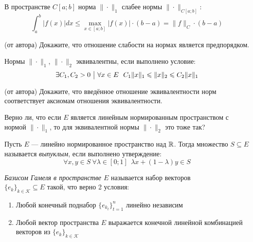 \begin{example}
	В пространстве $C[a; b]$ норма $\|\cdot\|_1$ слабее нормы $\|\cdot\|_{C[a; b]}$:
	\[
		\int_a^b |f(x)|dx \le \max_{x \in [a; b]} |f(x)| \cdot (b - a) = \|f\|_C \cdot (b - a)
	\]
\end{example}

\begin{exercise} (от автора)
	Докажите, что отношение слабости на нормах является предпорядком.
\end{exercise}

\begin{definition}
	Нормы $\|\cdot\|_1$, $\|\cdot\|_2$ эквивалентны, если выполнено условие:
	\[
		\exists C_1, C_2 > 0 \such \forall x \in E\ \ C_1\|x\|_1 \le \|x\|_2 \le C_2\|x\|_1
	\]
\end{definition}

\begin{exercise} (от автора)
	Докажите, что введённое отношение эквивалентности норм соответствует аксиомам отношения эквивалентности.
\end{exercise}

\begin{exercise}
	Верно ли, что если $E$ является линейным нормированным пространством с нормой $\|\cdot\|_1$, то для эквивалентной нормы $\|\cdot\|_2$ это тоже так?
\end{exercise}

\begin{definition}
	Пусть $E$ --- линейно нормированное пространство над $\mathbb{R}$. Тогда множество $S \subseteq E$ называется \textit{выпуклым}, если выполнено утверждение:
	\[
		\forall x, y \in S\ \forall \lambda \in [0; 1]\ \ \lambda x + (1 - \lambda)y \in S
	\]
\end{definition}

\begin{definition}
	\textit{Базисом Гамеля в пространстве $E$} называется набор векторов \\ $\{e_k\}_{k \in \mathcal{K}} \subseteq E$ такой, что верно 2 условия:
	\begin{enumerate}
		\item Любой конечный поднабор $\{e_{k_t}\}_{t = 1}^n$ линейно независим
		
		\item Любой вектор пространства $E$ выражается конечной линейной комбинацией векторов из $\{e_k\}_{k \in \mathcal{K}}$
	\end{enumerate}
\end{definition}

